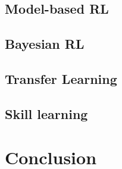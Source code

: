 \subsection{Model-based RL}
\subsection{Bayesian RL}
\subsection{Transfer Learning}
\subsection{Skill learning}


\section{Conclusion}


